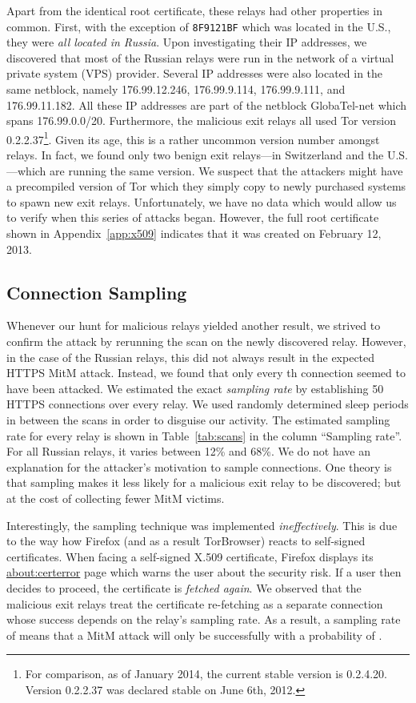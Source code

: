 \documentclass[letterpaper,twocolumn,10pt]{article}
\begin{document}
Apart from the identical root certificate, these relays had other properties in common.  First, with
the exception of \texttt{8F9121BF} which was located in the U.S., they were \emph{all located in
Russia}.  Upon investigating their IP addresses, we discovered that most of the Russian relays were
run in the network of a virtual private system (VPS) provider.  Several IP addresses were also
located in the same netblock, namely 176.99.12.246, 176.99.9.114, 176.99.9.111, and 176.99.11.182.
All these IP addresses are part of the netblock GlobaTel-net which spans 176.99.0.0/20.
Furthermore, the malicious exit relays all used Tor version 0.2.2.37\footnote{For comparison, as of
January 2014, the current stable version is 0.2.4.20.  Version 0.2.2.37 was declared stable on June
6th, 2012.}.  Given its age, this is a rather uncommon version number amongst relays.  In fact, we
found only two benign exit relays---in Switzerland and the U.S.---which are running the same
version.  We suspect that the attackers might have a precompiled version of Tor which they simply
copy to newly purchased systems to spawn new exit relays.  Unfortunately, we have no data which
would allow us to verify when this series of attacks began.  However, the full root certificate
shown in Appendix~\ref{app:x509} indicates that it was created on February 12, 2013.

\subsection{Connection Sampling}
\label{sec:sampling}
Whenever our hunt for malicious relays yielded another result, we strived to confirm the attack by
rerunning the scan on the newly discovered relay.  However, in the case of the Russian relays, this
did not always result in the expected HTTPS MitM attack.  Instead, we found that only every th
connection seemed to have been attacked.  We estimated the exact \emph{sampling rate} by
establishing 50 HTTPS connections over every relay.  We used randomly determined sleep
periods in between the scans in order to disguise our activity.  The estimated sampling rate for
every relay is shown in Table~\ref{tab:scans} in the column ``Sampling rate''.  For all Russian
relays, it varies between 12\% and 68\%.  We do not have an explanation for the attacker's
motivation to sample connections.  One theory is that sampling makes it less likely for a malicious
exit relay to be discovered; but at the cost of collecting fewer MitM victims.

Interestingly, the sampling technique was implemented \emph{ineffectively}.  This is due to the way
how Firefox (and as a result TorBrowser) reacts to self-signed certificates.  When facing a
self-signed X.509 certificate, Firefox displays its \url{about:certerror} page which warns the user
about the security risk.  If a user then decides to proceed, the certificate is \emph{fetched
again}.  We observed that the malicious exit relays treat the certificate re-fetching as a separate
connection whose success depends on the relay's sampling rate.  As a result, a sampling rate of 
means that a MitM attack will only be successfully with a probability of .
\end{document}
